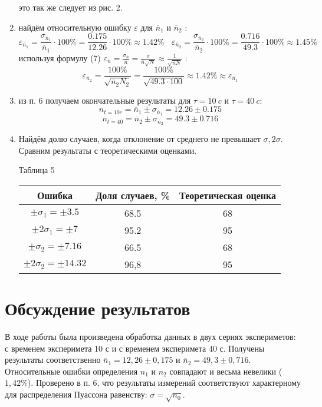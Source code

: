 \documentclass[a4paper, 12pt]{article}
\begin{document}
\begin{enumerate}
            это так же следует из рис. 2.
            \item найдём относительную ошибку $\varepsilon$ для $\overline{n}_1$ и $\overline{n}_2$ :
            \[ \varepsilon_{\overline{n}_1} = \frac{\sigma_{\overline{n}_1}}{\overline{n}_1} \cdot 100\% = \frac{0.175}{12.26} \cdot 100\% \approx 1.42\% \:\:\:\: \varepsilon_{\overline{n}_2} = \frac{\sigma_{\overline{n}_2}}{\overline{n}_2} \cdot 100\% = \frac{0.716}{49.3} \cdot 100\% \approx 1.45\%
            \]
            используя формулу (7) $\varepsilon_{\overline{n}} = \frac{\sigma_{\overline{n}}}{\overline{n}} = \frac{\sigma}{\overline{n} \sqrt{N}} \approx \frac{1}{\sqrt{\overline{n}N}}$ :
            \[ \varepsilon_{\overline{n}_2}  = \frac{100\%}{\sqrt{\overline{n}_2N_2}} = \frac{100\%}{\sqrt{49.3 \cdot 100}} \approx 1.42\% \approx \varepsilon_{\overline{n}_1}
            \]
            \item из п. 6 получаем окончательные результаты для $\tau = 10\ c$ и $\tau = 40\ c$:
            \[ n_{t=10c} = \overline{n}_1 \pm \sigma_{\overline{n}_1} = 12.26 \pm 0.175
            \]
            \[ n_{t=40} = \overline{n}_2 \pm \sigma_{\overline{n}_2} = 49.3 \pm 0.716
            \]
		\item Найдём долю случаев, когда отклонение от среднего не превышает $\sigma, 2\sigma$. Сравним результаты с теоретическими оценками.
		\begin{center}
                Таблица 5
			\begin{tabular}{|c|c|c|}
				\hline
				Ошибка & Доля случаев, \% & Теоретическая оценка \\\hline
				$\pm\sigma_1 = \pm3.5$ & 68.5 & 68\\\hline
				$\pm2\sigma_1 = \pm7$ & 95.2 & 95\\\hline \hline
				$\pm\sigma_2 = \pm7.16$ & 66.5 & 68\\\hline
				$\pm2\sigma_2 = \pm14.32$ & 96,8 & 95\\\hline 
			\end{tabular}    
		\end{center}
	\end{enumerate}
\section{Обсуждение результатов}
В ходе работы была произведена обработка данных в двух сериях экспериметов: с временем эксперимета 10 с и с временем эксперимета 40 с. Получены результаты соответственно $\overline n_1 = 12,26 \pm 0,175$ и   $\overline n_2 = 49,3 \pm 0,716$. Относительные ошибки определения $n_1$ и $n_2$ совпадают и весьма невелики ($1,42 \%$). Проверено в п. 6, что результаты измерений соответствуют характерному для распределения Пуассона равенству: $\sigma = \sqrt{n_0}$.
\end{document}
